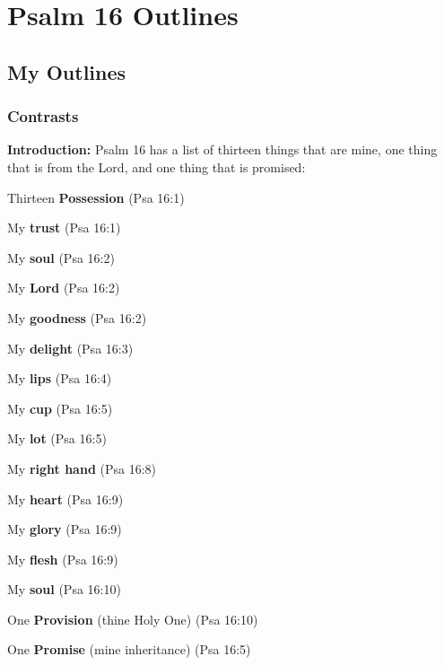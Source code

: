 \section{Psalm 16 Outlines}

\subsection{My Outlines}

\subsubsection{Contrasts}
\textbf{Introduction:} Psalm 16 has a list of thirteen things that are mine, one thing that is from the Lord, and one thing that is promised:
\begin{compactenum}[I.][8]
	\item Thirteen \textbf{Possession} (Psa 16:1)
	\begin{compactenum}[A.]
	    \item My \textbf{trust} (Psa 16:1)
	    \item My \textbf{soul} (Psa 16:2)
	    \item My \textbf{Lord} (Psa 16:2)
	    \item My \textbf{goodness} (Psa 16:2)
	    \item My \textbf{delight} (Psa 16:3)
	    \item My \textbf{lips} (Psa 16:4)
	    \item My \textbf{cup} (Psa 16:5)
	    \item My \textbf{lot} (Psa 16:5)
	    \item My \textbf{right hand} (Psa 16:8)
	    \item My \textbf{heart} (Psa 16:9)
	    \item My \textbf{glory} (Psa 16:9)
	    \item My \textbf{flesh} (Psa 16:9)
	    \item My \textbf{soul} (Psa 16:10)
	\end{compactenum}
	\item One \textbf{Provision} (thine Holy One) (Psa 16:10)
	\item One \textbf{Promise} (mine inheritance) (Psa 16:5)
\end{compactenum}

